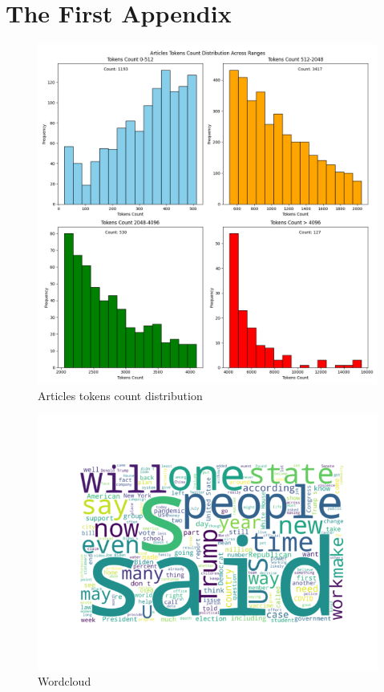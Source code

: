 \chapter{The First Appendix}
\label{app:A}

\begin{figure}[ht]
    \centering
    \includegraphics[width=0.9\linewidth]{figures/tokens_count_vx_split_hist.png}
    \caption{Articles tokens count distribution}
    \label{fig:tokens_hist_split}
\end{figure}

\begin{figure}[ht]
    \centering
    \includegraphics[width=0.9\linewidth]{figures/wordcloud_vx.png}
    \caption{Wordcloud}
    \label{fig:wordcloud}
\end{figure}



